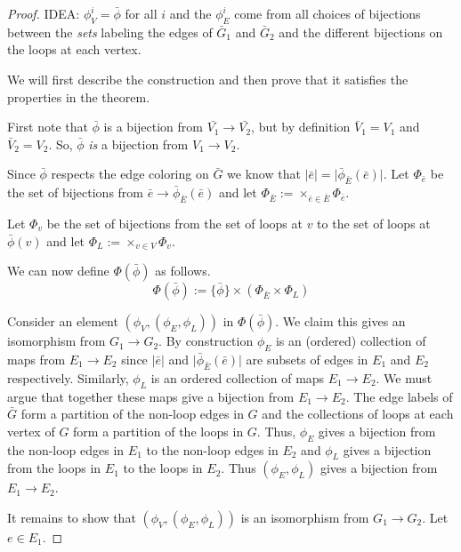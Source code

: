 \documentclass[amsmath,secnumarabic,floatfix,amssymb,nofootinbib,nobibnotes,letterpaper,11pt,tightenlines,showkeys]{revtex4}
\theoremstyle{definition}
\newcommand{\abs}[1]{\lvert#1\rvert}
\begin{document}
\begin{proof}
	IDEA: $\phi^i_V = \bar{\phi}$ for all $i$ and the $\phi^i_E$ come from all choices of bijections between the \emph{sets} labeling the edges of $\bar{G}_1$ and $\bar{G}_2$ and the different bijections on the loops at each vertex.

	We will first describe the construction and then prove that it satisfies the properties in the theorem. 

	First note that $\bar{\phi}$ is a bijection from $\bar{V_1} \rightarrow \bar{V_2}$, but by definition $\bar{V}_1 = V_1$ and $\bar{V}_2 = V_2$. So,  $\bar{\phi}$ \emph{is} a bijection from $V_1 \rightarrow V_2$.

	Since $\bar{\phi}$ respects the edge coloring on $\bar{G}$ we know that $\abs{\bar{e}}=\abs{\bar{\phi}_{\bar{E}}(\bar{e})}$. Let $\Phi_{\bar{e}}$ be the set of bijections from $\bar{e} \rightarrow \bar{\phi}_{\bar{E}}(\bar{e})$ and let $\Phi_{\bar{E}} := \times_{\bar{e} \in \bar{E}} \Phi_{\bar{e}} $. 

	Let $\Phi_{v}$ be the set of bijections from the set of loops at $v$ to the set of loops at $\bar{\phi}(v)$ and let $\Phi_{L} := \times_{v \in V} \Phi_{v} $.

	We can now define $\Phi(\bar{\phi})$ as follows. $$\Phi(\bar{\phi}) := \{\bar{\phi}\} \times (\Phi_{\bar{E}} \times \Phi_{L})$$

	Consider an element $(\phi_{V},(\phi_{E},\phi_L))$ in $\Phi(\bar{\phi})$. We claim this gives an isomorphism from $G_1 \rightarrow G_2$. By construction $\phi_E$ is an (ordered) collection of maps from $E_1 \rightarrow E_2$ since $\abs{\bar{e}}$ and $\abs{\bar{\phi}_{\bar{E}}(\bar{e})}$ are subsets of edges in $E_1$ and $E_2$ respectively. Similarly, $\phi_L$ is an ordered collection of maps $E_1 \rightarrow E_2$. We must argue that together these maps give a bijection from $E_1 \rightarrow E_2$. The edge labels of $\bar{G}$ form a partition of the non-loop edges in $G$ and the collections of loops at each vertex of $G$ form a partition of the loops in $G$. Thus, $\phi_E$ gives a bijection from the non-loop edges in $E_1$ to the non-loop edges in $E_2$ and $\phi_L$ gives a bijection from the loops in $E_1$ to the loops in $E_2$. Thus $(\phi_E,\phi_L)$ gives a bijection from $E_1 \rightarrow E_2$. 

	It remains to show that $(\phi_{V},(\phi_{E},\phi_L))$ is an isomorphism from $G_1 \rightarrow G_2$. Let $e \in E_1$. 

	
\end{proof}


\end{document}
